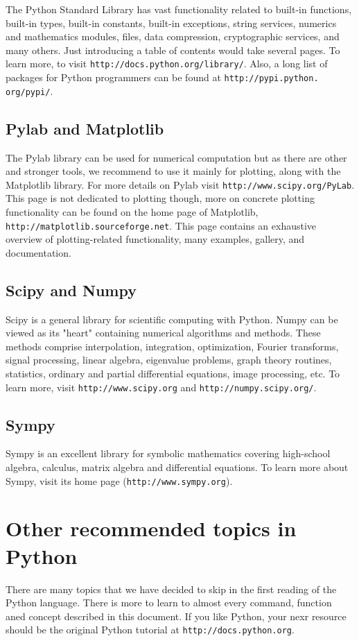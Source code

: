 The Python Standard Library has vast functionality related to 
built-in functions, built-in types, built-in constants, built-in
exceptions, string services, numerics and mathematics modules, files,
data compression, cryptographic services, and many others. Just introducing 
a table of contents would take several pages. To learn more,
to visit {\tt http://docs.python.org/library/}. Also, a long list of packages for Python 
programmers can be found at {\tt http://pypi.python. org/pypi/}.

\subsection{Pylab and Matplotlib}

The Pylab library can be used for numerical computation but as there are other 
and stronger tools, we recommend to use it mainly for plotting, along with the 
Matplotlib library. For more details on Pylab visit {\tt http://www.scipy.org/PyLab}.
This page is not dedicated to plotting though, more on concrete plotting functionality 
can be found on the home page of Matplotlib, {\tt http://matplotlib.sourceforge.net}.
This page contains an exhaustive overview of plotting-related functionality, many
examples, gallery, and documentation.

\subsection{Scipy and Numpy}

Scipy is a general library for scientific computing with 
Python. Numpy can be viewed as its "heart" containing numerical 
algorithms and methods. These methods comprise interpolation, 
integration, optimization, Fourier transforms, signal processing, 
linear algebra, eigenvalue problems, graph theory routines,
statistics, ordinary and partial differential equations,
image processing, etc. To learn more, visit 
{\tt http://www.scipy.org} and {\tt http://numpy.scipy.org/}. 

\subsection{Sympy}

Sympy is an excellent library for symbolic mathematics covering high-school 
algebra, calculus, matrix algebra and differential equations. To learn more
about Sympy, visit its home page ({\tt http://www.sympy.org}).

\section{Other recommended topics in Python} \label{sec:adv}

There are many topics that we have decided to skip in the first reading 
of the Python language. There is more to learn to almost every command,
function aned concept described in this document. If you like Python,
your nexr resource should be the original Python tutorial at 
{\tt http://docs.python.org}. 




